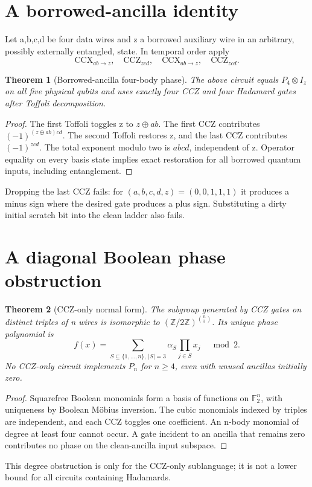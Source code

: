 \documentclass[11pt,a4paper]{article}
\newtheorem{theorem}{Theorem}
\begin{document}
\section{A borrowed-ancilla identity}
Let a,b,c,d be four data wires and z a borrowed auxiliary wire in an arbitrary, possibly externally entangled, state. In temporal order apply
\[
\mathrm{CCX}_{ab\to z},\quad
\mathrm{CCZ}_{zcd},\quad
\mathrm{CCX}_{ab\to z},\quad
\mathrm{CCZ}_{zcd}.
\]
\begin{theorem}[Borrowed-ancilla four-body phase]
The above circuit equals $P_4\otimes I_z$ on all five physical qubits and uses exactly four CCZ and four Hadamard gates after Toffoli decomposition.
\end{theorem}
\begin{proof}
The first Toffoli toggles z to $z\oplus ab$. The first CCZ contributes $(-1)^{(z\oplus ab)cd}$. The second Toffoli restores z, and the last CCZ contributes $(-1)^{zcd}$. The total exponent modulo two is $abcd$, independent of z. Operator equality on every basis state implies exact restoration for all borrowed quantum inputs, including entanglement.
\end{proof}
Dropping the last CCZ fails: for $(a,b,c,d,z)=(0,0,1,1,1)$ it produces a minus sign where the desired gate produces a plus sign. Substituting a dirty initial scratch bit into the clean ladder also fails.

\section{A diagonal Boolean phase obstruction}
\begin{theorem}[CCZ-only normal form]
The subgroup generated by CCZ gates on distinct triples of n wires is isomorphic to $(\mathbb Z/2\mathbb Z)^{\binom n3}$. Its unique phase polynomial is
\[
f(x)=\sum_{S\subseteq\{1,\ldots,n\},\,|S|=3}
\alpha_S\prod_{j\in S}x_j\quad\bmod2.
\]
No CCZ-only circuit implements $P_n$ for $n\ge4$, even with unused ancillas initially zero.
\end{theorem}
\begin{proof}
Squarefree Boolean monomials form a basis of functions on $\mathbb F_2^n$, with uniqueness by Boolean M\"obius inversion. The cubic monomials indexed by triples are independent, and each CCZ toggles one coefficient. An n-body monomial of degree at least four cannot occur. A gate incident to an ancilla that remains zero contributes no phase on the clean-ancilla input subspace.
\end{proof}
This degree obstruction is only for the CCZ-only sublanguage; it is not a lower bound for all circuits containing Hadamards.
\end{document}
